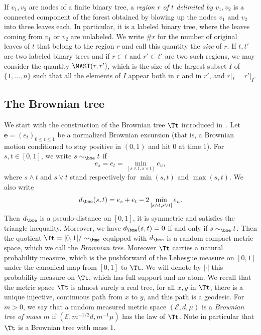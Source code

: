 If $v_1, v_2$ are nodes of a finite binary tree, a \emph{region $r$ of $t$ delimited by $v_1, v_2$} is a connected component of the forest obtained by blowing up the nodes $v_1$ and $v_2$ into three leaves each. In particular, it is a labeled binary tree, where the leaves coming from $v_1$ or $v_2$ are unlabeled.
We write $\# r$ for the number of original leaves of $t$ that belong to the region $r$ and call this quantity the \emph{size} of $r$.
If $t,t'$ are two labeled binary trees and if $r \subset t$ and $r' \subset t'$ are two such regions, we may consider the quantity $\MAST(r,r')$, which is the size of the largest subset $I$ of $\{1,\dots,n\}$ such that all the elements of $I$ appear both in $r$ and in $r'$, and $r|_I=r'|_I$.

\subsection{The Brownian tree}\label{subsec:BCRT}

We start with the construction of the Brownian tree $\Tt$ introduced in~\cite{Ald91, Ald93}. Let $\mathbf{e}=(e_t)_{0 \leq t \leq 1}$ be a normalized Brownian excursion (that is, a Brownian motion conditioned to stay positive in $(0,1)$ and hit $0$ at time $1$). For $s,t \in [0,1]$, we write $s \sim_{\bme} t$ if\vspace*{-3pt}
\[ e_s=e_t=\min_{[s \wedge t, s \vee t]} e_u,\]
where $s \wedge t$ and $s \vee t$ stand respectively for $\min(s,t)$ and $\max(s,t)$.
We also write\vspace*{-3pt}
\[ d_{\bme}(s,t)=e_s+e_t-2 \min_{[s \wedge t, s \vee t]} e_u. \]
Then $d_{\bme}$ is a pseudo-distance on $[0,1]$, \ie it is symmetric and satisfies the triangle inequality. Moreover, we have $d_{\bme}(s,t)=0$ if and only if $s \sim_{\bme} t$.
Then the quotient $\Tt=[0,1] / \sim_{\bme}$ equipped with $d_{\bme}$ is a random compact metric space, which we call the \emph{Brownian tree}.
Moreover $\Tt$ carries a natural probability measure, which is the pushforward of the Lebesgue measure on $[0,1]$ under the canonical map from $[0,1]$ to $\Tt$.
We will denote by $|\cdot |$ this probability measure on $\Tt$, which has full support and no atom.
We recall that the metric space $\Tt$ is almost surely a real tree, \ie for all $x,y$ in $\Tt$, there is a unique injective, continuous path from $x$ to $y$, and this path is a geodesic.
For $m>0$, we say that a random measured metric space $(\mathcal{E},d,\mu)$ is a \emph{Brownian tree of mass $m$} if $(\mathcal{E}, m^{-1/2}d, m^{-1}\mu)$ has the law of $\Tt$.
Note in particular that $\Tt$ is a Brownian tree with mass $1$.

